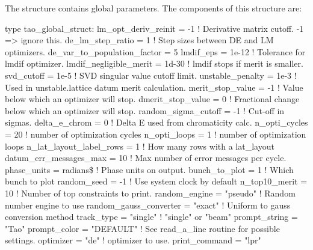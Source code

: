 {{{{{{{{
The  structure contains \tao global parameters. The components of this structure are:
\begin{example}
type tao_global_struct:
  lm_opt_deriv_reinit = -1         ! Derivative matrix cutoff. -1 => ignore this.
  de_lm_step_ratio = 1             ! Step sizes between DE and LM optimizers.
  de_var_to_population_factor = 5 
  lmdif_eps = 1e-12                ! Tolerance for lmdif optimizer.
  lmdif_negligible_merit = 1d-30   ! lmdif stops if merit is smaller.
  svd_cutoff = 1e-5                ! SVD singular value cutoff limit.
  unstable_penalty = 1e-3          ! Used in unstable.lattice datum merit calculation.
  merit_stop_value = -1            ! Value below which an optimizer will stop.
  dmerit_stop_value = 0            ! Fractional change below which an optimizer will stop.
  random_sigma_cutoff = -1         ! Cut-off in sigmas.
  delta_e_chrom = 0                ! Delta E used from chromaticity calc.
  n_opti_cycles = 20               ! number of optimization cycles
  n_opti_loops = 1                 ! number of optimization loops
  n_lat_layout_label_rows = 1      ! How many rows with a lat_layout
  datum_err_messages_max = 10      ! Max number of error messages per cycle.
  phase_units = radians\$          ! Phase units on output.
  bunch_to_plot = 1                ! Which bunch to plot
  random_seed = -1                 ! Use system clock by default
  n_top10_merit = 10               ! Number of top constraints to print.
  random_engine = "pseudo"         ! Random number engine to use
  random_gauss_converter = "exact" ! Uniform to gauss conversion method
  track_type = "single"            ! "single" or "beam" 
  prompt_string = "Tao"
  prompt_color = "DEFAULT"         ! See read_a_line routine for possible settings.
  optimizer     = "de"             ! optimizer to use.
  print_command = "lpr"

\end{example}}}}}}}}}
